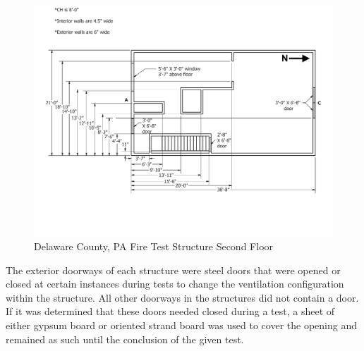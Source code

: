\documentclass[12pt,oneside]{book}
\begin{document}
\begin{figure}[!ht]
	\centering
	\includegraphics[width=\columnwidth]{Figures/Air_Entrainment/West_Test_Structure_2nd_Floor_nodim.pdf}
	\caption{Delaware County, PA Fire Test Structure Second Floor}
	\label{fig:Delaware_County,_PA_Fire_Test_Structure_Second_Floor}
\end{figure}

The exterior doorways of each structure were steel doors that were opened or closed at certain instances during tests to change the ventilation configuration within the structure. All other doorways in the structures did not contain a door. If it was determined that these doors needed closed during a test, a sheet of either gypsum board or oriented strand board was used to cover the opening and remained as such until the conclusion of the given test.


\end{document}
